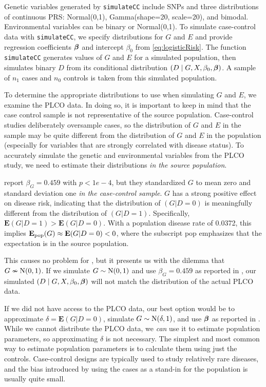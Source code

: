 \documentclass{article}\usepackage[]{graphicx}\usepackage[]{color}
\def\bbeta{\mbox{\boldmath $\beta$}}
\def\code#1{\texttt{#1}}
\begin{document}
Genetic variables generated by \code{simulateCC} include SNPs and three distributions of continuous PRS: Normal(0,1), Gamma(shape=20, scale=20), and bimodal.  Environmental variables can be binary or Normal(0,1).  To simulate case-control data with \code{simulateCC}, we specify distributions for $G$ and $E$ and provide regression coefficients $\bbeta$ and intercept $\beta_0$ from \cref{eq:logisticRisk}.  The function \code{simulateCC} generates values of $G$ and $E$ for a simulated population, then simulates binary $D$ from its conditional distribution $(D \mid G, X, \beta_0, \bbeta)$.  A sample of $n_1$ cases and $n_0$ controls is taken from this simulated population.

To determine the appropriate distributions to use when simulating $G$ and $E$, we examine the PLCO data.  In doing so, it is important to keep in mind that the case control sample is not representative of the source population.  Case-control studies deliberately oversample cases, so the distribution of $G$ and $E$ in the sample may be quite different from the distribution of $G$ and $E$ in the population (especially for variables that are strongly correlated with disease status).  To accurately simulate the genetic and environmental variables from the PLCO study, we need to estimate their distributions \emph{in the source population}.

\citeauthor{Wang2018unpublished} report $\beta_G = 0.459$ with $p < 1e-4$, but they standardized $G$ to mean zero and standard deviation one \emph{in the case-control sample}.  $G$ has a strong positive effect on disease risk, indicating that the distribution of $(G|D=0)$ is meaningfully different from the distribution of $(G|D=1)$.  Specifically, $\mathbf{E}(G|D=1) > \mathbf{E}(G|D=0)$.  With a population disease rate of 0.0372, this implies $\mathbf{E_{\rm pop}}(G) \approx \mathbf{E}(G|D=0) < 0$, where the subscript pop emphasizes that the expectation is in the source population.

This causes no problem for \citeauthor{Wang2018unpublished}, but it presents us with the dilemma that $G \nsim \hbox{N}(0,1)$.  If we simulate $G \sim \hbox{N}(0,1)$ and use $\beta_G = 0.459$ as reported in \citeauthor{Wang2018unpublished}, our simulated $(D \mid G, X, \beta_0, \bbeta)$ will not match the distribution of the actual PLCO data.

If we did not have access to the PLCO data, our best option would be to approximate $\delta = \mathbf{E}(G|D=0)$, simulate $G \sim \hbox{N}(\delta, 1)$, and use $\bbeta$ as reported in \citeauthor{Wang2018unpublished}.  While we cannot distribute the PLCO data, we \emph{can} use it to estimate population parameters, so approximating $\delta$ is not necessary.  The simplest and most common way to estimate population parameters is to calculate them using just the controls.  Case-control designs are typically used to study relatively rare diseases, and the bias introduced by using the cases as a stand-in for the population is usually quite small.
\end{document}
